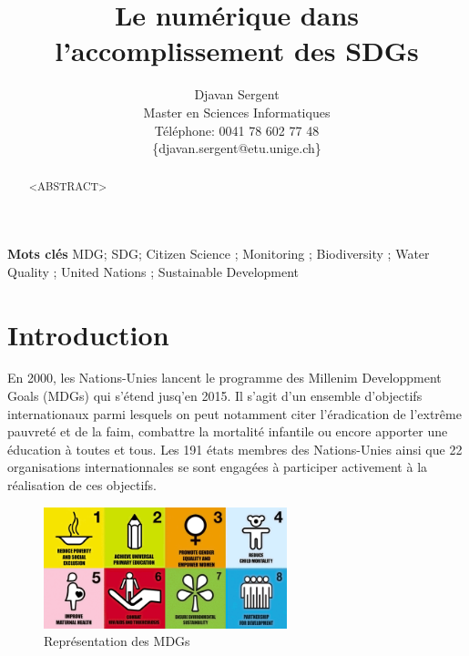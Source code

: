 \documentclass[10pt, conference, compsocconf]{llncs}
\begin{document}
%
\title{Le numérique dans\\l'accomplissement des SDGs}





% 
\author{Djavan Sergent \\
Master en Sciences Informatiques \\
Téléphone: 0041 78 602 77 48 \\
 \{djavan.sergent@etu.unige.ch\}}




\maketitle


\begin{abstract}
	<ABSTRACT>
\end{abstract}


\textbf{Mots clés}
MDG; SDG; Citizen Science ; Monitoring ; Biodiversity ; Water Quality ; United Nations ; Sustainable Development


\section{Introduction}
	En 2000, les Nations-Unies lancent le programme des Millenim Developpment Goals (MDGs) qui s'étend jusq'en 2015. Il s'agit d'un ensemble d'objectifs internationaux parmi lesquels on peut notamment citer l'éradication de l'extrême pauvreté et de la faim, combattre la mortalité infantile ou encore apporter une éducation à toutes et tous. Les 191 états membres des Nations-Unies ainsi que 22 organisations internationnales se sont engagées à participer activement à la réalisation de ces objectifs.
	\begin{figure}
		\begin{center}
			\includegraphics[width=200pt]{mdgs-full.png}
		\end{center}
		\caption{Représentation des MDGs}
	\end{figure}
	
\end{document}
